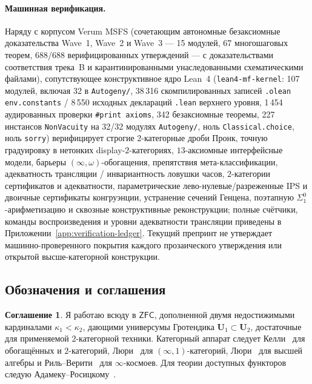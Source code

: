 \documentclass[11pt]{article}
\theoremstyle{plain}
\theoremstyle{definition}
\newtheorem{convention}[theorem]{Соглашение}
\newcommand{\ZFC}{\mathsf{ZFC}}
\begin{document}
\paragraph{Машинная верификация.} Наряду с корпусом Verum MSFS (сочетающим автономные безаксиомные доказательства Wave~1, Wave~2 и Wave~3 --- 15 модулей, 67 многошаговых теорем, 688/688 верифицированных утверждений --- с доказательствами соответствия трека~B и карантинированными унаследованными схематическими файлами), сопутствующее конструктивное ядро Lean~4 (\texttt{lean4-mf-kernel}: 107 модулей, включая 32 в \texttt{Autogeny/}, 38\,316 скомпилированных записей \texttt{.olean} \texttt{env.constants} / 8\,550 исходных деклараций \texttt{.lean} верхнего уровня, 1\,454 аудированных проверки \texttt{\#print axioms}, 342 безаксиомные теоремы, 227 инстансов \texttt{NonVacuity} на 32/32 модулях \texttt{Autogeny/}, ноль \texttt{Classical.choice}, ноль \texttt{sorry}) верифицирует строгие $2$-категорные дроби Пронк, точную градуировку в нетонких display-$2$-категориях, $13$-аксиомные интерфейсные модели, барьеры $(\infty,\omega)$-обогащения, препятствия мета-классификации, адекватность трансляции / инвариантность ловушки часов, $2$-категории сертификатов и адекватности, параметрические лево-нулевые/разреженные \textup{IPS} и двоичные сертификаты конгруэнции, устранение сечений Генцена, поэтапную $\Sigma^0_1$-арифметизацию и сквозные конструктивные реконструкции; полные счётчики, команды воспроизведения и уровни адекватности трансляции приведены в Приложении~\ref{app:verification-ledger}. Текущий препринт не утверждает машинно-проверенного покрытия каждого прозаического утверждения или открытой высше-категорной конструкции.

\subsection{Обозначения и соглашения}

\begin{convention}\label{conv:zfc-inacc}
Я работаю всюду в $\ZFC$, дополненной двумя недостижимыми кардиналами $\kappa_1 < \kappa_2$, дающими универсумы Гротендика $\mathbf{U}_1 \subset \mathbf{U}_2$, достаточные для применяемой $2$-категорной техники. Категорный аппарат следует Келли~\cite{Kelly1982} для обогащённых и $2$-категорий, Люри~\cite{LurieHTT} для $(\infty, 1)$-категорий, Люри~\cite{LurieHA} для высшей алгебры и Риль--Верити~\cite{RiehlVerity2022} для $\infty$-космоев. Для теории доступных функторов следую Адамеку--Росицкому~\cite{AdamekRosicky1994}.
\end{convention}
\end{document}
